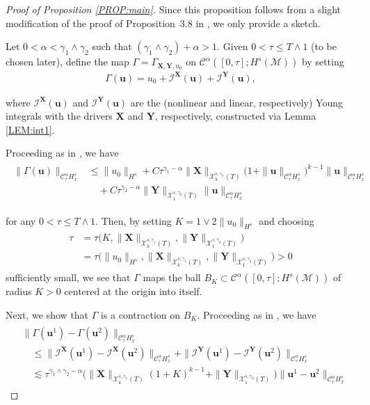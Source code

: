 \documentclass[letterpaper, 11pt,  reqno]{amsart}
\newcommand{\1}{\hspace{0.5mm}\textup{I}\hspace{0.5mm}}
\newcommand{\I}{\mathcal{I}}
\newcommand{\noi}{\noindent}
\newcommand{\CC}{\mathcal{C}}
\newcommand{\al}{\alpha}
\newcommand{\g}{\gamma}
\newcommand{\G}{\Gamma}
\newcommand{\les}{\lesssim}
\newcommand{\M}{\mathcal{M}}
\newcommand{\cC}{\mathcal{C}}
\newcommand{\cX}{\mathcal{X}}
\newcommand{\uu}{\mathbf{u}}
\newcommand{\XX}{\mathbf{X}}
\newcommand{\YY}{\mathbf{Y}}
\numberwithin{equation}{section}
\numberwithin{theorem}{section}
\begin{document}
\begin{proof}[Proof of Proposition \ref{PROP:main}]

Since this proposition follows from a slight modification
of the proof of Proposition~3.8 in \cite{CGLLO1}, 
we only provide  a sketch.






Let $0 < \al < \g_1\wedge \g_2$ such that 
 $ (\g_1\wedge \g_2) + \al>1$. 
Given $0 < \tau \le T\wedge 1$ (to be chosen later), 
 define 
 the map
$\G = \G_{\XX, \YY, u_0}$ on $\cC^\al([0, \tau]; H^s(\M))$
by setting
\begin{align}
\G(\uu) = u_0 + \I^\XX(\uu)+ \I^\YY(\uu), 
\label{YD3}
\end{align}

\noi
where 
$\I^\XX(\uu)$ and $\I^\YY(\uu)$
are the (nonlinear and linear, respectively)
Young integrals with the drivers $\XX$ and $\YY$, respectively, 
constructed via
Lemma \ref{LEM:int1}.

Proceeding as in \cite[(3.53)]{CGLLO1}, we have
\begin{align}
\label{YD5a}
\begin{split}
\|\G(\uu)\|_{\CC^\al_\tau H^s_x}
& \le \|u_0\|_{H^s} +  C\tau^{\g_1 - \al}
\|\XX\|_{\cX^{s, \g_1}_k(T)}
\big(1+ 
\|\uu\|_{\CC^\al_{\tau } H^s_x}\big)^{k-1}
\|\uu\|_{\CC^\al_{\tau } H^s_x}\\
& \quad
+  C\tau^{\g_2 - \al}
\|\YY\|_{\cX^{s, \g_2}_1(T)}
\|\uu\|_{\CC^\al_{\tau } H^s_x}
\end{split}
\end{align}

\noi
for any $0 < \tau \le T\wedge 1$.
Then, by setting $K = 1 \vee 2 \|u_0\|_{H^s} $
and choosing 
\begin{align}
\begin{split}
\tau 
& = 
\tau\Big(K, \|\XX\|_{\cX^{s, \g_1}_k(T)}, \|\YY\|_{\cX^{s, \g_2}_1(T)}\Big) \\
& = 
\tau\Big(\|u_0\|_{H^s}, \|\XX\|_{\cX^{s, \g_1}_k(T)}, \|\YY\|_{\cX^{s, \g_2}_1(T)}\Big) >0
\end{split}
\label{YD4}
\end{align}
sufficiently small, 
we see that 
$\G$ maps the ball $B_K\subset 
\cC^\al([0, \tau]; H^s(\M))$
of radius $K > 0$ 
centered at the origin into itself.

Next, we show that $\G$ is a contraction on $B_K$. 
Proceeding as in \cite[(3.64)]{CGLLO1}, 
we have 
\begin{align}
\begin{split}
& \|\G(\uu^1)- \G(\uu^2)\|_{\cC^\al _{\tau} H^s_x}\\
& \quad \le  
\|\I^\XX(\uu^1)- \I^\XX(\uu^2)\|_{\CC^\al_{\tau}H^s_x}
+ \|\I^\YY(\uu^1)- \I^\YY(\uu^2)\|_{\CC^\al_{\tau}H^s_x}\\
&  
\quad \les 
\tau^{\g_1\wedge \g_2 - \al}
\Big(\|\XX\|_{\cX^{s, \g_1}_k(T)}  (1+K)^{k-1}
+ \|\YY\|_{\cX^{s, \g_2}_1(T)}\Big) \|\uu^1- \uu^2 \|_{\CC^\al _\tau H^s_x}
\end{split}
\label{YD14}
\end{align}


\end{proof}
\end{document}
